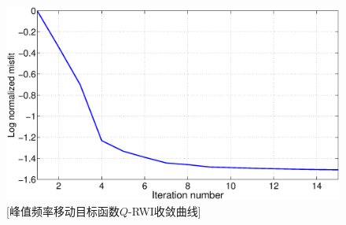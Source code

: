 \begin{figure}[!htbp]
    \centering
    {\includegraphics[width=1.0\linewidth]{figure/fmisfit}}
	[峰值频率移动目标函数$Q$-RWI收敛曲线]
    \label{fig:misfit_fmodel}
\end{figure}

